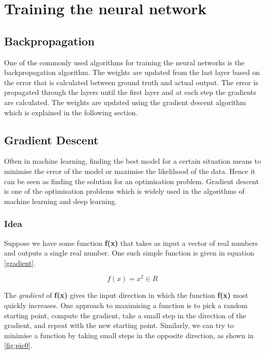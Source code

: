 \documentclass[a4paper, 12pt, oneside, BCOR1cm,toc=chapterentrywithdots]{scrbook}
\begin{document}
\section{Training the neural network}

\subsection{Backpropagation}

One of the commonly used algorithms for training the neural networks is the backpropagation algorithm. The weights are updated from the last layer based on the error that is calculated between ground truth and actual output. The error is propagated through the layers until the first layer and at each step the gradients are calculated. The weights are updated using the gradient descent algorithm which is explained in the following section.

\subsection{Gradient Descent}

Often in machine learning, finding the best model for a certain situation means to minimise the error of the model or maximise the likelihood of the data. Hence it can be seen as finding the solution for an optimisation problem. Gradient descent is one of the optimisation problems which is widely used in the algorithms of machine learning and deep learning. 

\subsubsection{Idea}

Suppose we have some function \textbf{f(x)} that takes as input a vector of real numbers and outputs a single real number. One such simple function is given in equation \ref{gradient}. 

\begin{equation} \label{gradient}
f(x) = x^2  \in R
\end{equation}

The \textit{gradient} of \textbf{f(x)} gives the input direction in which the function \textbf{f(x)} most quickly increases. One approach to maximising a function is to pick a random starting point, compute the gradient, take a small step in the direction of the gradient, and repeat with the new starting point. Similarly, we can try to minimise a function by taking small steps in the opposite direction, as shown in \ref{fig:pic0}. 
\end{document}
